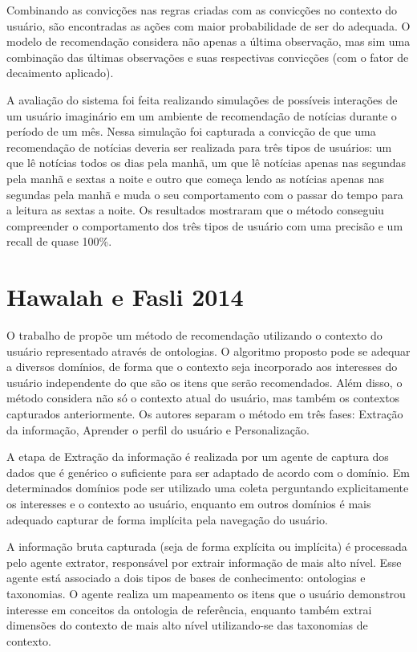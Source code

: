 Combinando as convicções nas regras criadas com as convicções no contexto do usuário, são encontradas as ações com
maior probabilidade de ser do adequada. O modelo de recomendação considera não apenas a última observação, mas sim uma
combinação das últimas observações e suas respectivas convicções (com o fator de decaimento aplicado).

A avaliação do sistema foi feita realizando simulações de possíveis interações de um usuário imaginário em um ambiente
de recomendação de notícias durante o período de um mês. Nessa simulação foi capturada a convicção de que uma
recomendação de notícias deveria ser realizada para três tipos de usuários: um que lê notícias todos os dias pela
manhã, um que lê notícias apenas nas segundas pela manhã e sextas a noite e outro que começa lendo as notícias apenas
nas segundas pela manhã e muda o seu comportamento com o passar do tempo para a leitura as sextas a noite. Os resultados
mostraram que o método conseguiu compreender o comportamento dos três tipos de usuário com uma precisão e um recall de
quase 100\%.

\section{Hawalah e Fasli 2014}

O trabalho de  propõe um método de recomendação utilizando o contexto do usuário
representado através de ontologias. O algoritmo proposto pode se adequar a diversos domínios, de forma que o contexto
seja incorporado aos interesses do usuário independente do que são os itens que serão recomendados. Além disso, o método
considera não só o contexto atual do usuário, mas também os contextos capturados anteriormente. Os autores separam o
método em três fases: Extração da informação, Aprender o perfil do usuário e Personalização.

A etapa de Extração da informação é realizada por um agente de captura dos dados que é genérico o suficiente para ser
adaptado de acordo com o domínio. Em determinados domínios pode ser utilizado uma coleta perguntando explicitamente os
interesses e o contexto ao usuário, enquanto em outros domínios é mais adequado capturar de forma implícita pela
navegação do usuário.

A informação bruta capturada (seja de forma explícita ou implícita) é processada pelo agente extrator, responsável por
extrair informação de mais alto nível. Esse agente está associado a dois tipos de bases de conhecimento: ontologias e
taxonomias. O agente realiza um mapeamento os itens que o usuário demonstrou interesse em conceitos da ontologia de
referência, enquanto também extrai dimensões do contexto de mais alto nível utilizando-se das taxonomias de contexto.

